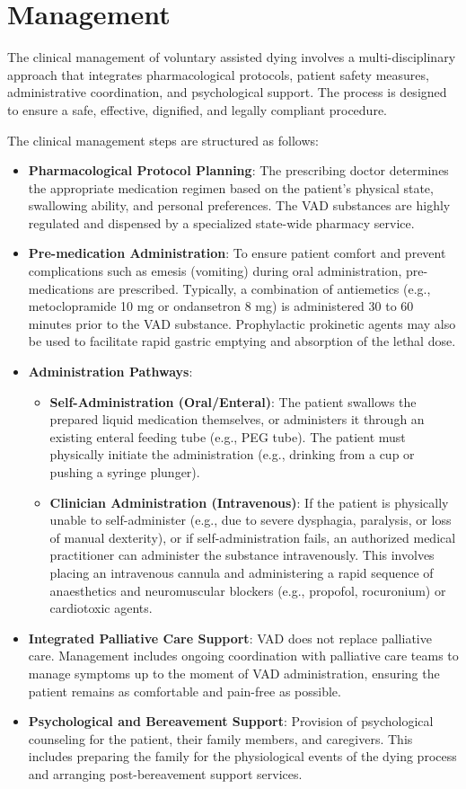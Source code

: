 \section*{Management}
The clinical management of voluntary assisted dying involves a multi-disciplinary approach that integrates pharmacological protocols, patient safety measures, administrative coordination, and psychological support. The process is designed to ensure a safe, effective, dignified, and legally compliant procedure.

The clinical management steps are structured as follows:
\begin{itemize}
    \item \textbf{Pharmacological Protocol Planning}: The prescribing doctor determines the appropriate medication regimen based on the patient's physical state, swallowing ability, and personal preferences. The VAD substances are highly regulated and dispensed by a specialized state-wide pharmacy service.
    \item \textbf{Pre-medication Administration}: To ensure patient comfort and prevent complications such as emesis (vomiting) during oral administration, pre-medications are prescribed. Typically, a combination of antiemetics (e.g., metoclopramide 10 mg or ondansetron 8 mg) is administered 30 to 60 minutes prior to the VAD substance. Prophylactic prokinetic agents may also be used to facilitate rapid gastric emptying and absorption of the lethal dose.
    \item \textbf{Administration Pathways}:
    \begin{itemize}
        \item \textbf{Self-Administration (Oral/Enteral)}: The patient swallows the prepared liquid medication themselves, or administers it through an existing enteral feeding tube (e.g., PEG tube). The patient must physically initiate the administration (e.g., drinking from a cup or pushing a syringe plunger).
        \item \textbf{Clinician Administration (Intravenous)}: If the patient is physically unable to self-administer (e.g., due to severe dysphagia, paralysis, or loss of manual dexterity), or if self-administration fails, an authorized medical practitioner can administer the substance intravenously. This involves placing an intravenous cannula and administering a rapid sequence of anaesthetics and neuromuscular blockers (e.g., propofol, rocuronium) or cardiotoxic agents.
    \end{itemize}
    \item \textbf{Integrated Palliative Care Support}: VAD does not replace palliative care. Management includes ongoing coordination with palliative care teams to manage symptoms up to the moment of VAD administration, ensuring the patient remains as comfortable and pain-free as possible.
    \item \textbf{Psychological and Bereavement Support}: Provision of psychological counseling for the patient, their family members, and caregivers. This includes preparing the family for the physiological events of the dying process and arranging post-bereavement support services.
\end{itemize}

